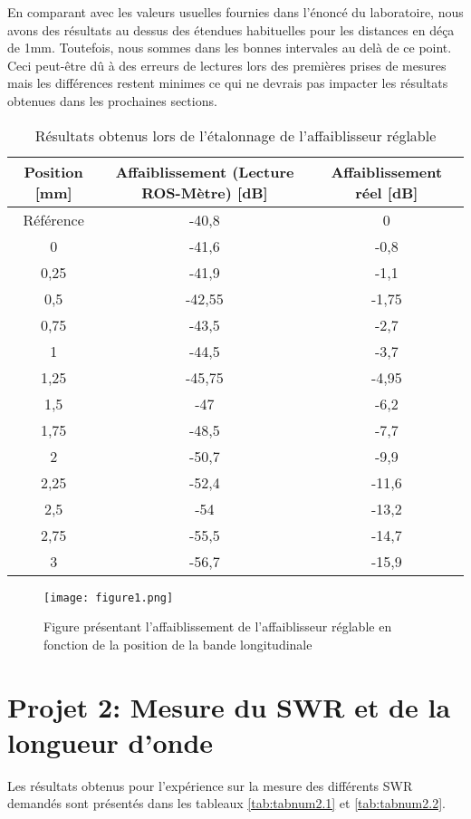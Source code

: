 En comparant avec les valeurs usuelles fournies dans l'énoncé du laboratoire, nous avons des résultats au dessus des étendues habituelles pour les distances en  
déça de 1mm. Toutefois, nous sommes dans les bonnes intervales au delà de ce point. Ceci peut-être dû à des erreurs de lectures lors des premières prises de mesures mais les différences restent minimes ce qui ne devrais pas impacter les résultats obtenues dans les prochaines sections.
 \begin{table}[htbp]
  \centering
    \begin{tabular}{|c||c|c|} \hline
   Position [mm] & Affaiblissement (Lecture ROS-Mètre) [dB] & Affaiblissement réel [dB]\\ \hline \hline 
Référence & -40,8 & 0\\  
0 & -41,6 & -0,8\\ 
0,25 & -41,9 & -1,1\\ 
0,5 & -42,55 & -1,75\\ 
0,75 & -43,5 & -2,7\\ 
1 & -44,5 & -3,7\\ 
1,25 & -45,75 & -4,95\\ 
1,5 & -47 & -6,2\\ 
1,75 & -48,5 & -7,7\\ 
2 & -50,7 & -9,9\\ 
2,25 & -52,4 & -11,6\\ 
2,5 & -54 & -13,2\\ 
2,75 & -55,5 & -14,7\\ 
3 & -56,7 & -15,9\\ \hline 
    \end{tabular}%
      \caption{Résultats obtenus lors de l'étalonnage de l'affaiblisseur réglable}
  \label{tab:etalonnage_affaib}%
\end{table}%

\begin{figure}[htbp]
    \centering
    \texttt{[image: figure1.png]}
    \caption{Figure présentant l'affaiblissement de l'affaiblisseur réglable en fonction de la position de la bande longitudinale}
    \label{fig:affaiblissement}
\end{figure}

\section{Projet 2: Mesure du SWR et de la longueur d'onde}
Les résultats obtenus pour l'expérience sur la mesure des différents SWR demandés sont présentés dans les tableaux \ref{tab:tabnum2.1} et \ref{tab:tabnum2.2}.


